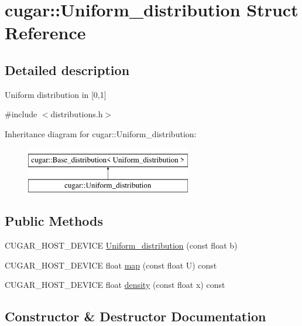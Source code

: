 \hypertarget{structcugar_1_1_uniform__distribution}{}\section{cugar\+:\+:Uniform\+\_\+distribution Struct Reference}
\label{structcugar_1_1_uniform__distribution}


\subsection{Detailed description}
Uniform distribution in \mbox{[}0,1\mbox{]} 

{\ttfamily \#include $<$distributions.\+h$>$}

Inheritance diagram for cugar\+:\+:Uniform\+\_\+distribution\+:\begin{figure}[H]
\begin{center}
\leavevmode
\includegraphics[height=2.000000cm]{structcugar_1_1_uniform__distribution}
\end{center}
\end{figure}
\subsection*{Public Methods}
\begin{DoxyCompactItemize}
\item 
C\+U\+G\+A\+R\+\_\+\+H\+O\+S\+T\+\_\+\+D\+E\+V\+I\+CE \hyperlink{structcugar_1_1_uniform__distribution_a73d0ee891f7c4ce135e039b9edeccfc2}{Uniform\+\_\+distribution} (const float b)
\item 
C\+U\+G\+A\+R\+\_\+\+H\+O\+S\+T\+\_\+\+D\+E\+V\+I\+CE float \hyperlink{structcugar_1_1_uniform__distribution_ab9b26e8d82eee3e960ea1d7d1b54feae}{map} (const float U) const
\item 
C\+U\+G\+A\+R\+\_\+\+H\+O\+S\+T\+\_\+\+D\+E\+V\+I\+CE float \hyperlink{structcugar_1_1_uniform__distribution_a0f664494544db0de8c364005547862dd}{density} (const float x) const
\end{DoxyCompactItemize}


\subsection{Constructor \& Destructor Documentation}
\mbox{\label{structcugar_1_1_uniform__distribution_a73d0ee891f7c4ce135e039b9edeccfc2}} 
